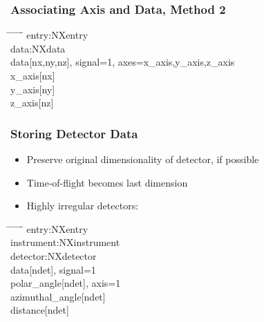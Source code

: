 \documentclass{beamer}
\begin{document}
\begin{frame} \frametitle{Associating Axis and Data, Method 2}
\begin{tabbing}
\hspace*{1cm} \= \hspace*{1cm} \= \hspace*{1cm} \= \hspace*{1cm} \= \hspace*{1cm} \= \hspace*{1cm}\= \kill
entry:NXentry \\
 \>data:NXdata\\
 \> \> data[nx,ny,nz], signal=1, axes=x\_axis,y\_axis,z\_axis\\
 \> \> x\_axis[nx]\\
 \> \> y\_axis[ny]\\
 \> \> z\_axis[nz]\\
\end{tabbing}
\end{frame}


\begin{frame}
\frametitle{Storing Detector Data}
\begin{itemize}
\item Preserve original dimensionality of detector, if possible
\item Time-of-flight becomes last dimension
\item Highly irregular detectors:
\end{itemize}
\begin{tabbing}
\hspace*{1cm} \= \hspace*{1cm} \= \hspace*{1cm} \= \hspace*{1cm} \= \hspace*{1cm} \= \hspace*{1cm}\= \kill
entry:NXentry \\
\>instrument:NXinstrument\\
\> \>detector:NXdetector\\
\>  \> \> data[ndet], signal=1\\
\> \> \> polar\_angle[ndet], axis=1\\
\> \> \> azimuthal\_angle[ndet]\\
\> \> \> distance[ndet]\\
\end{tabbing}
\end{frame}
\end{document}
